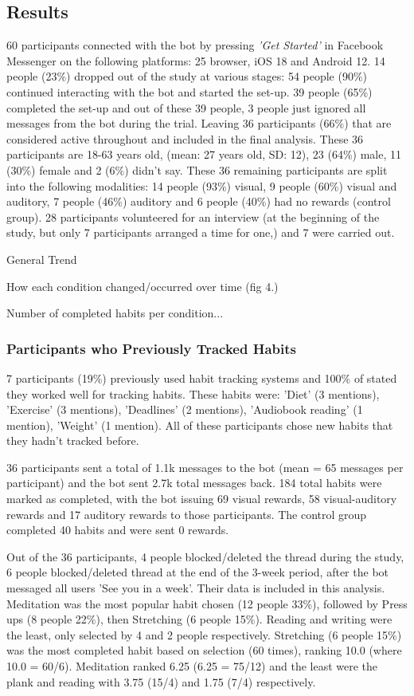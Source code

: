 \documentclass{scaffold/sigchi}
\begin{document}
\subsection{Results}
60 participants connected with the bot by pressing \textit{'Get Started'} in Facebook Messenger on the following platforms: 25 browser, iOS 18 and Android 12. 14 people (23\%) dropped out of the study at various stages: 54 people (90\%) continued interacting with the bot and started the set-up. 39 people (65\%) completed the set-up and out of these 39 people, 3 people just ignored all messages from the bot during the trial. Leaving 36 participants (66\%) that are considered active throughout and included in the final analysis. These 36 participants are 18-63 years old, (mean: 27 years old, SD: 12), 23 (64\%) male, 11 (30\%) female and 2 (6\%) didn't say. These 36 remaining participants are split into the following modalities: 14 people (93\%) visual, 9 people (60\%) visual and auditory, 7 people (46\%) auditory and 6 people (40\%) had no rewards (control group). 28 participants volunteered for an interview (at the beginning of the study, but only 7 participants arranged a time for one,) and 7 were carried out.

General Trend

How each condition changed/occurred over time (fig 4.)

Number of completed habits per condition...

\subsubsection{Participants who Previously Tracked Habits}
7 participants (19\%) previously used habit tracking systems and 100\% of stated they worked well for tracking habits. These habits were: 'Diet' (3 mentions), 'Exercise' (3 mentions), 'Deadlines' (2 mentions), 'Audiobook reading' (1 mention), 'Weight' (1 mention). All of these participants chose new habits that they hadn't tracked before.

36 participants sent a total of 1.1k messages to the bot (mean = 65 messages per participant) and the bot sent 2.7k total messages back. 184 total habits were marked as completed, with the bot issuing 69 visual rewards, 58 visual-auditory rewards and 17 auditory rewards to those participants. The control group completed 40 habits and were sent 0 rewards.

Out of the 36 participants, 4 people blocked/deleted the thread during the study, 6 people blocked/deleted thread at the end of the 3-week period, after the bot messaged all users 'See you in a week'. Their data is included in this analysis. Meditation was the most popular habit chosen (12 people 33\%), followed by Press ups (8 people 22\%), then Stretching (6 people 15\%). Reading and writing were the least, only selected by 4 and 2 people respectively. Stretching (6 people 15\%) was the most completed habit based on selection (60 times), ranking 10.0 (where 10.0 = 60/6). Meditation ranked 6.25 (6.25 = 75/12) and the least were the plank and reading with 3.75 (15/4) and 1.75 (7/4) respectively.
\end{document}
